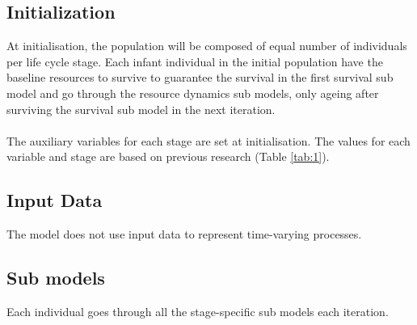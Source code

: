 \documentclass{article}
\begin{document}
\subsection{Initialization}

At initialisation, the population will be composed of equal number of individuals per life cycle stage. Each infant individual in the initial population have the baseline resources to survive to guarantee the survival in the first survival sub model and go through the resource dynamics sub models, only ageing after surviving the survival sub model in the next iteration.
\\\\
The auxiliary variables for each stage are set at initialisation. The values for each variable and stage are based on previous research (Table \ref{tab:1}).

\subsection{Input Data}

The model does not use input data to represent time-varying processes.

\subsection{Sub models}

Each individual goes through all the stage-specific sub models each iteration.
\end{document}
